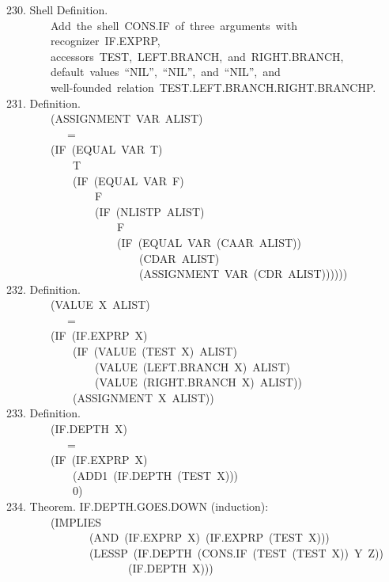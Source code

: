 \documentclass[10pt]{book}
\newenvironment{pubasis}{\begin{flushleft}}{\end{flushleft}}
\begin{document}
\begin{pubasis}
230.    Shell Definition.\\
~~~~~~~~Add~the~shell~CONS.IF~of~three~arguments~with\\
~~~~~~~~recognizer~IF.EXPRP,\\
~~~~~~~~accessors~TEST,~LEFT.BRANCH,~and~RIGHT.BRANCH,\\
~~~~~~~~default~values~``NIL'',~``NIL'',~and~``NIL'',~and\\
~~~~~~~~well-founded~relation~TEST.LEFT.BRANCH.RIGHT.BRANCHP.\\

231.    Definition.\\
~~~~~~~~(ASSIGNMENT~VAR~ALIST)\\
~~~~~~~~~~~=\\
~~~~~~~~(IF~(EQUAL~VAR~T)\\
~~~~~~~~~~~~T\\
~~~~~~~~~~~~(IF~(EQUAL~VAR~F)\\
~~~~~~~~~~~~~~~~F\\
~~~~~~~~~~~~~~~~(IF~(NLISTP~ALIST)\\
~~~~~~~~~~~~~~~~~~~~F\\
~~~~~~~~~~~~~~~~~~~~(IF~(EQUAL~VAR~(CAAR~ALIST))\\
~~~~~~~~~~~~~~~~~~~~~~~~(CDAR~ALIST)\\
~~~~~~~~~~~~~~~~~~~~~~~~(ASSIGNMENT~VAR~(CDR~ALIST))))))\\

232.    Definition.\\
~~~~~~~~(VALUE~X~ALIST)\\
~~~~~~~~~~~=\\
~~~~~~~~(IF~(IF.EXPRP~X)\\
~~~~~~~~~~~~(IF~(VALUE~(TEST~X)~ALIST)\\
~~~~~~~~~~~~~~~~(VALUE~(LEFT.BRANCH~X)~ALIST)\\
~~~~~~~~~~~~~~~~(VALUE~(RIGHT.BRANCH~X)~ALIST))\\
~~~~~~~~~~~~(ASSIGNMENT~X~ALIST))\\

233.    Definition.\\
~~~~~~~~(IF.DEPTH~X)\\
~~~~~~~~~~~=\\
~~~~~~~~(IF~(IF.EXPRP~X)\\
~~~~~~~~~~~~(ADD1~(IF.DEPTH~(TEST~X)))\\
~~~~~~~~~~~~0)\\

234.    Theorem.  IF.DEPTH.GOES.DOWN (induction):\\
~~~~~~~~(IMPLIES\\
~~~~~~~~~~~~~~~(AND~(IF.EXPRP~X)~(IF.EXPRP~(TEST~X)))\\
~~~~~~~~~~~~~~~(LESSP~(IF.DEPTH~(CONS.IF~(TEST~(TEST~X))~Y~Z))\\
~~~~~~~~~~~~~~~~~~~~~~(IF.DEPTH~X)))\\


\end{pubasis}
\end{document}
